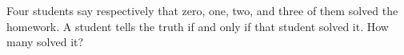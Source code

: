 Four students say respectively that zero, one, two, and three of them solved the homework. A student tells the truth if and only if that student solved it. How many solved it?
